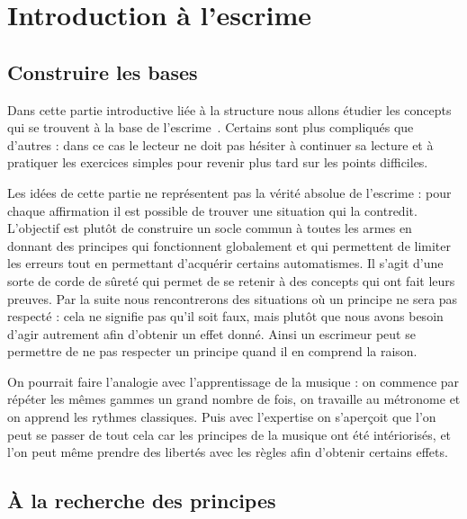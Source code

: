 \chapter{Introduction à l'escrime}


\section{Construire les bases}


Dans cette partie introductive liée à la structure nous allons étudier les concepts qui se trouvent à la base de l'escrime~\footnotemark{}.
Certains sont plus compliqués que d'autres : dans ce cas le lecteur ne doit pas hésiter à continuer sa lecture et à pratiquer les exercices simples pour revenir plus tard sur les points difficiles.

Les idées de cette partie ne représentent pas la vérité absolue de l'escrime : pour chaque affirmation il est possible de trouver une situation qui la contredit.
L'objectif est plutôt de construire un socle commun à toutes les armes en donnant des principes qui fonctionnent globalement et qui permettent de limiter les erreurs tout en permettant d'acquérir certains automatismes.
Il s'agit d'une sorte de corde de sûreté qui permet de se retenir à des concepts qui ont fait leurs preuves.
Par la suite nous rencontrerons des situations où un principe ne sera pas respecté : cela ne signifie pas qu'il soit faux, mais plutôt que nous avons besoin d'agir autrement afin d'obtenir un effet donné.
Ainsi un escrimeur peut se permettre de ne pas respecter un principe quand il en comprend la raison.

On pourrait faire l'analogie avec l'apprentissage de la musique : on commence par répéter les mêmes gammes un grand nombre de fois, on travaille au métronome et on apprend les rythmes classiques.
Puis avec l'expertise on s'aperçoit que l'on peut se passer de tout cela car les principes de la musique ont été intériorisés, et l'on peut même prendre des libertés avec les règles afin d'obtenir certains effets.


\section{À la recherche des principes}


